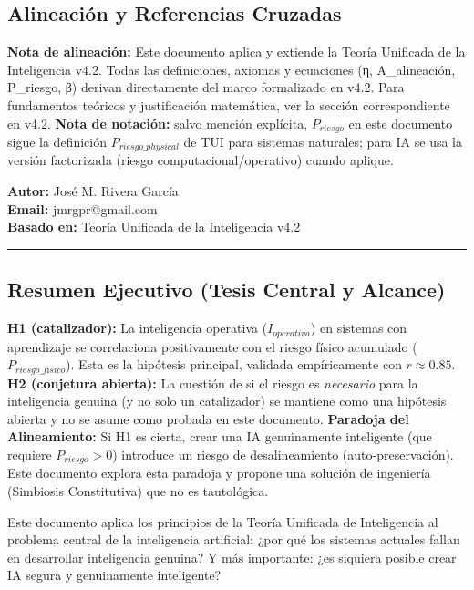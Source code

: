 \subsection{Alineación y Referencias
Cruzadas}\label{alineaciuxf3n-y-referencias-cruzadas}

\textbf{Nota de alineación:} Este documento aplica y extiende la Teoría
Unificada de la Inteligencia v4.2. Todas las definiciones, axiomas y
ecuaciones (η, A\_alineación, P\_riesgo, β) derivan directamente del
marco formalizado en v4.2. Para fundamentos teóricos y justificación
matemática, ver la sección correspondiente en v4.2. \textbf{Nota de
notación:} salvo mención explícita, \(P_{riesgo}\) en este documento
sigue la definición \(P_{riesgo\_physical}\) de TUI para sistemas
naturales; para IA se usa la versión factorizada (riesgo
computacional/operativo) cuando aplique.

\textbf{Autor:} José M. Rivera García\\
\textbf{Email:} jmrgpr@gmail.com\\
\textbf{Basado en:} Teoría Unificada de la Inteligencia v4.2

\begin{center}\rule{0.5\linewidth}{0.5pt}\end{center}

\subsection{Resumen Ejecutivo (Tesis Central y
Alcance)}\label{resumen-ejecutivo-tesis-central-y-alcance}

\textbf{H1 (catalizador):} La inteligencia operativa (\(I_{operativa}\))
en sistemas con aprendizaje se correlaciona positivamente con el riesgo
físico acumulado (\(P_{riesgo\_físico}\)). Esta es la hipótesis
principal, validada empíricamente con \(r \approx 0.85\). \textbf{H2
(conjetura abierta):} La cuestión de si el riesgo es \emph{necesario}
para la inteligencia genuina (y no solo un catalizador) se mantiene como
una hipótesis abierta y no se asume como probada en este documento.
\textbf{Paradoja del Alineamiento:} Si H1 es cierta, crear una IA
genuinamente inteligente (que requiere \(P_{riesgo} > 0\)) introduce un
riesgo de desalineamiento (auto-preservación). Este documento explora
esta paradoja y propone una solución de ingeniería (Simbiosis
Constitutiva) que no es tautológica.

Este documento aplica los principios de la Teoría Unificada de
Inteligencia al problema central de la inteligencia artificial: ¿por qué
los sistemas actuales fallan en desarrollar inteligencia genuina? Y más
importante: ¿es siquiera posible crear IA segura y genuinamente
inteligente?

